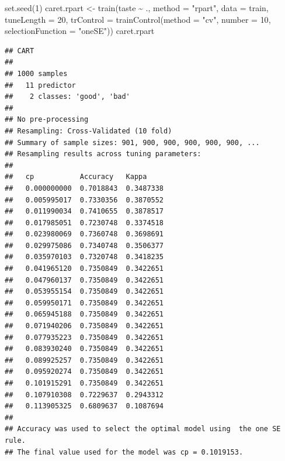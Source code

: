 \documentclass[
]{book}
\newenvironment{Shaded}{\begin{snugshade}}{\end{snugshade}}
\newcommand{\AttributeTok}[1]{\textcolor[rgb]{0.77,0.63,0.00}{#1}}
\newcommand{\CommentTok}[1]{\textcolor[rgb]{0.56,0.35,0.01}{\textit{#1}}}
\newcommand{\DecValTok}[1]{\textcolor[rgb]{0.00,0.00,0.81}{#1}}
\newcommand{\FunctionTok}[1]{\textcolor[rgb]{0.00,0.00,0.00}{#1}}
\newcommand{\NormalTok}[1]{#1}
\newcommand{\OtherTok}[1]{\textcolor[rgb]{0.56,0.35,0.01}{#1}}
\newcommand{\SpecialCharTok}[1]{\textcolor[rgb]{0.00,0.00,0.00}{#1}}
\newcommand{\StringTok}[1]{\textcolor[rgb]{0.31,0.60,0.02}{#1}}
\theoremstyle{break}
\theoremstyle{definition}
\theoremstyle{definition}
\theoremstyle{definition}
\theoremstyle{definition}
\theoremstyle{remark}
\begin{document}
\begin{Shaded}
\begin{Highlighting}[]
\FunctionTok{set.seed}\NormalTok{(}\DecValTok{1}\NormalTok{)}
\NormalTok{caret.rpart }\OtherTok{\textless{}{-}} \FunctionTok{train}\NormalTok{(taste }\SpecialCharTok{\textasciitilde{}}\NormalTok{ ., }\AttributeTok{method =} \StringTok{"rpart"}\NormalTok{, }\AttributeTok{data =}\NormalTok{ train, }
                     \AttributeTok{tuneLength =} \DecValTok{20}\NormalTok{,}
                     \AttributeTok{trControl =} \FunctionTok{trainControl}\NormalTok{(}\AttributeTok{method =} \StringTok{"cv"}\NormalTok{, }\AttributeTok{number =} \DecValTok{10}\NormalTok{,}
                                              \AttributeTok{selectionFunction =} \StringTok{"oneSE"}\NormalTok{)) }
\NormalTok{caret.rpart}
\end{Highlighting}
\end{Shaded}

\begin{verbatim}
## CART 
## 
## 1000 samples
##   11 predictor
##    2 classes: 'good', 'bad' 
## 
## No pre-processing
## Resampling: Cross-Validated (10 fold) 
## Summary of sample sizes: 901, 900, 900, 900, 900, 900, ... 
## Resampling results across tuning parameters:
## 
##   cp           Accuracy   Kappa    
##   0.000000000  0.7018843  0.3487338
##   0.005995017  0.7330356  0.3870552
##   0.011990034  0.7410655  0.3878517
##   0.017985051  0.7230748  0.3374518
##   0.023980069  0.7360748  0.3698691
##   0.029975086  0.7340748  0.3506377
##   0.035970103  0.7320748  0.3418235
##   0.041965120  0.7350849  0.3422651
##   0.047960137  0.7350849  0.3422651
##   0.053955154  0.7350849  0.3422651
##   0.059950171  0.7350849  0.3422651
##   0.065945188  0.7350849  0.3422651
##   0.071940206  0.7350849  0.3422651
##   0.077935223  0.7350849  0.3422651
##   0.083930240  0.7350849  0.3422651
##   0.089925257  0.7350849  0.3422651
##   0.095920274  0.7350849  0.3422651
##   0.101915291  0.7350849  0.3422651
##   0.107910308  0.7229637  0.2943312
##   0.113905325  0.6809637  0.1087694
## 
## Accuracy was used to select the optimal model using  the one SE rule.
## The final value used for the model was cp = 0.1019153.
\end{verbatim}

\begin{Shaded}
\end{Shaded}
\end{document}
